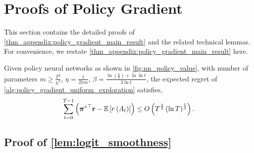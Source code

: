 \section{Proofs of Policy Gradient}

This section contains the detailed proofs of \cref{thm_appendix:policy_gradient_main_result} and the related technical lemmas. For convenience, we restate \cref{thm_appendix:policy_gradient_main_result} here.

\begin{thm}
	\label{thm_appendix:policy_gradient_main_result}
	Given policy neural networks as shown in \cref{fig:nn_policy_value}, with number of parameters $m \ge \frac{T^2}{h^2}$, $\eta = \frac{1}{2 h m}$, $\beta = \frac{ \ln{\left(\frac{h}{3}\right) + \ln{\ln{t}} } }{ 3 \ln{t}}$, the expected regret of \cref{alg:policy_gradient_uniform_exploration} satisfies,
	\begin{equation*}
	\begin{split}
	\sum\limits_{t=0}^{T-1}{ \left( {{\boldsymbol{\pi}}^*}^\top {\mathbf{r}} - {\mathbb{E}} \left[ r\left(A_t\right) \right] \right)} \le O\left(T^{\frac{2}{3}}\left( \ln{T} \right)^{\frac{1}{3}}\right).
	\end{split}
	\end{equation*}
\end{thm}

\subsection{Proof of \cref{lem:logit_smoothness}}

